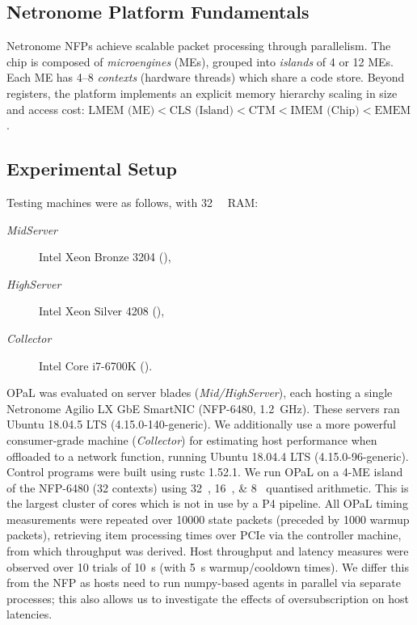 \documentclass[
sigconf,natbib=false
,anonymous=true
,10pt
]{acmart}
\newcommand{\approachshort}{OPaL}
\begin{document}
\subsection{Netronome Platform Fundamentals}\label{sec:netronome-platform-fundamentals}
Netronome NFPs achieve scalable packet processing through parallelism.
The chip is composed of \emph{microengines} (MEs), grouped into \emph{islands} of 4 or 12 MEs.
Each ME has \numrange{4}{8} \emph{contexts} (hardware threads) which share a code store.
Beyond registers, the platform implements an explicit memory hierarchy scaling in size and access cost:
$\text{LMEM (ME)} < \text{CLS (Island)} < \text{CTM} < \text{IMEM (Chip)} < \text{EMEM}$.

\subsection{Experimental Setup}\label{sec:experimental-setup}
Testing machines were as follows, with \SI{32}{\gibi\byte} RAM:
\begin{description}
	\item[\emph{MidServer}] Intel Xeon Bronze 3204 (),
	\item[\emph{HighServer}] Intel Xeon Silver 4208 (),
	\item[\emph{Collector}] Intel Core i7-6700K ().
\end{description}
\approachshort{} was evaluated on server blades (\emph{Mid/HighServer}), each hosting a single Netronome Agilio LX GbE SmartNIC (NFP-6480, \SI{1.2}{\giga\hertz}).
These servers ran Ubuntu 18.04.5 LTS (4.15.0-140-generic).
We additionally use a more powerful consumer-grade machine (\emph{Collector}) for estimating host performance when offloaded to a network function, running Ubuntu 18.04.4 LTS (4.15.0-96-generic).
Control programs were built using rustc 1.52.1.
We run \approachshort{} on a \num{4}-ME island of the NFP-6480 (\num{32} contexts) using \SIlist{32;16;8}{\bit} quantised arithmetic.
This is the largest cluster of cores which is not in use by a P4 pipeline.
All \approachshort{} timing measurements were repeated over \num{10000} state packets (preceded by \num{1000} warmup packets), retrieving item processing times over PCIe via the controller machine, from which throughput was derived.
Host throughput and latency measures were observed over \num{10} trials of \SI{10}{\second} (with \SI{5}{\second} warmup/cooldown times).
We differ this from the NFP as hosts need to run numpy-based agents in parallel via separate processes; this also allows us to investigate the effects of oversubscription on host latencies.
\end{document}
